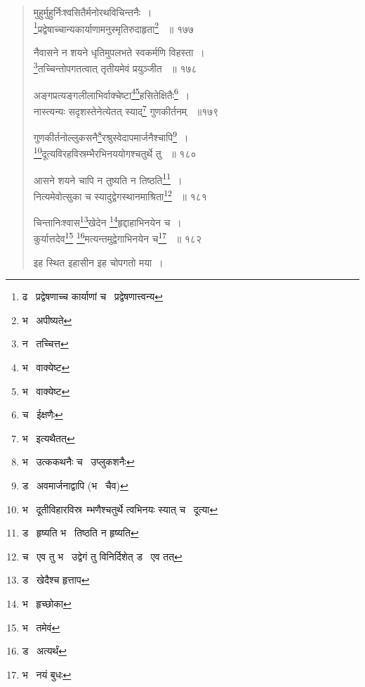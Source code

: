 \documentclass[11pt, openany]{book}
\begin{document}
\newpage

\begin{quote}
 {\na मुहुर्मुहुर्निःश्वसितैर्मनोरथविचिन्तनैः~। \\
\renewcommand{\thefootnote}{1}\footnote{ढ \textendash\ प्रद्वेषणाच्च कार्याणां च \textendash\ प्रद्वेषणात्त्वन्य}प्रद्वेषाच्चान्यकार्याणामनुस्मृतिरुदाहृता\renewcommand{\thefootnote}{2}\footnote{भ \textendash\ अपीष्यते} ~॥ १७७ 

नैवासने न शयने धृतिमुपलभते स्वकर्मणि विहस्ता~।\\ 
\renewcommand{\thefootnote}{3}\footnote{न \textendash\ तच्चित्त}तच्चिन्तोपगतत्वात् तृतीयमेवं प्रयुञ्जीत ~॥ १७८ 

अङ्गप्रत्यङ्गलीलाभिर्वाक्चेष्टा\renewcommand{\thefootnote}{4}\footnote{भ \textendash\ वाक्येष्ट}\renewcommand{\thefootnote}{4}\footnote{भ \textendash\ वाक्येष्ट}हसितेक्षितैः\renewcommand{\thefootnote}{5}\footnote{च \textendash\ ईक्षणैः }~।\\ 
नास्त्यन्यः सदृशस्तेनेत्येतत् स्याद्\renewcommand{\thefootnote}{6}\footnote{भ \textendash\ इत्यथैतत्} गुणकीर्तनम् ~॥१७९ 

गुणकीर्तनोल्लुकसनै\renewcommand{\thefootnote}{7}\footnote{भ \textendash\ उत्ककथनैः च \textendash\ उप्लुकशनैः}रश्रुस्वेदापमार्जनैश्चापि\renewcommand{\thefootnote}{8}\footnote{ड \textendash\ अवमार्जनाद्वापि (भ \textendash\ चैव) }~।\\ 
\renewcommand{\thefootnote}{9}\footnote{भ \textendash\ दूतीविहारविस्र\textendash\ म्भणैश्चतुर्थे त्वभिनयः स्यात् च \textendash\ दूत्या}दूत्यविरहविस्रम्भैरभिनययोगश्चतुर्थे तु ~॥ १८० 

आसने शयने चापि न तुष्यति न तिष्ठति\renewcommand{\thefootnote}{10}\footnote{ड \textendash\ हृष्यति भ \textendash\ तिष्ठति न हृष्यति}~।\\ 
नित्यमेवोत्सुका च स्यादुद्वेगस्थानमाश्रिता\renewcommand{\thefootnote}{11}\footnote{च \textendash\ एव तु भ \textendash\ उद्वेगं तु विनिर्दिशेत् ड \textendash\ एव तत् } ~॥ १८१ 

चिन्तानिःश्वास\renewcommand{\thefootnote}{12}\footnote{ड \textendash\ खेदैश्च हृत्ताप }खेदेन \renewcommand{\thefootnote}{13}\footnote{भ \textendash\ हृच्छोका}हृद्दाहाभिनयेन च~। \\
कुर्यात्तदेव\renewcommand{\thefootnote}{14}\footnote{भ \textendash\ तमेवं } \renewcommand{\thefootnote}{15}\footnote{ड \textendash\ अत्यर्थं}मत्यन्तमुद्वेगाभिनयेन च\renewcommand{\thefootnote}{16}\footnote{भ \textendash\ नयं बुधः } ~॥ १८२ 

इह स्थित इहासीन इह चोपगतो मया~। }
\end{quote}
\end{document}
